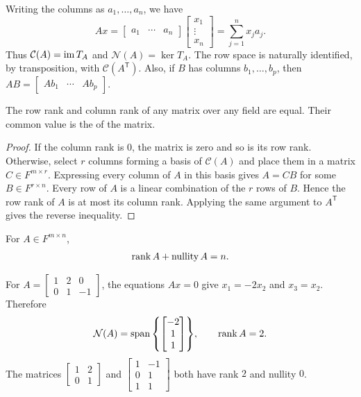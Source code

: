Writing the columns as $a_1,\ldots,a_n$, we have
\begin{equation*}
Ax=\begin{bmatrix}a_1&\cdots&a_n\end{bmatrix}\begin{bmatrix}x_1\\\vdots\\x_n\end{bmatrix}=\sum_{j=1}^n x_ja_j.
\end{equation*}
Thus $\mathcal C(A)=\operatorname{im} T_A$ and $\mathcal N(A)=\ker T_A$. The row space is naturally identified, by transposition, with $\mathcal C(A^{\mathsf T})$. Also, if $B$ has columns $b_1,\ldots,b_p$, then $AB=\begin{bmatrix}Ab_1&\cdots&Ab_p\end{bmatrix}$.

\begin{Theorem}\label{thm:RowColumnRank}
The row rank and column rank of any matrix over any field are equal. Their common value is the  of the matrix.
\end{Theorem}
\begin{proof}
If the column rank is $0$, the matrix is zero and so is its row rank. Otherwise, select $r$ columns forming a basis of $\mathcal C(A)$ and place them in a matrix $C\in F^{m\times r}$. Expressing every column of $A$ in this basis gives $A=CB$ for some $B\in F^{r\times n}$. Every row of $A$ is a linear combination of the $r$ rows of $B$. Hence the row rank of $A$ is at most its column rank. Applying the same argument to $A^{\mathsf T}$ gives the reverse inequality.
\end{proof}

\begin{Corollary}
For $A\in F^{m\times n}$,
\begin{equation*}
\rank A+\operatorname{nullity} A=n.
\end{equation*}
\end{Corollary}

\begin{Example}
For $A=\begin{bmatrix}1&2&0\\0&1&-1\end{bmatrix}$, the equations $Ax=0$ give $x_1=-2x_2$ and $x_3=x_2$. Therefore
\begin{equation*}
\mathcal N(A)=\operatorname{span}\qty{\begin{bmatrix}-2\\1\\1\end{bmatrix}},\qquad \rank A=2.
\end{equation*}
The matrices $\begin{bmatrix}1&2\\0&1\end{bmatrix}$ and $\begin{bmatrix}1&-1\\0&1\\1&1\end{bmatrix}$ both have rank $2$ and nullity $0$.
\end{Example}

